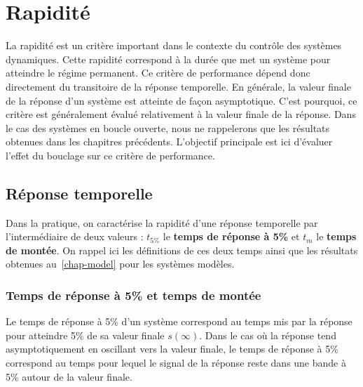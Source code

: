 \section{Rapidité}
La rapidité est un critère important dans le contexte du contrôle des 
systèmes dynamiques. Cette rapidité correspond à la durée que met un 
système pour atteindre le régime permanent. Ce critère de performance 
dépend donc directement du transitoire de la réponse temporelle. 
En générale, la valeur finale de la réponse d'un système est atteinte de 
façon asymptotique. C'est pourquoi, ce critère est généralement évalué 
relativement à la valeur finale de la réponse. 
Dans le cas des systèmes en boucle ouverte, nous ne rappelerons que les 
résultats obtenues dans les chapitres précédents. 
L'objectif principale est ici d'évaluer l'effet du bouclage sur ce critère 
de performance.

\subsection{Réponse temporelle}
Dans la pratique, on caractérise la rapidité d'une réponse temporelle par 
l'intermédiaire de deux valeurs : $t_{5\%}$ le \textbf{temps de réponse à 5\%}
et $t_m$ le \textbf{temps de montée}. 
On rappel ici les définitions de ces deux temps ainsi que 
les résultats obtenues au~\cref{chap-model} pour les systèmes modèles.

\subsubsection{Temps de réponse à 5\% et temps de montée}

Le temps de réponse à 5\% d'un système correspond au temps mis par la réponse 
pour atteindre 5\% de sa valeur finale $s(\infty)$. Dans le cas où la réponse 
tend asymptotiquement en oscillant vers la valeur finale, le temps de
réponse à 5\% correspond au temps pour lequel le signal de la réponse reste
dans une bande à 5\% autour de la valeur finale. 

